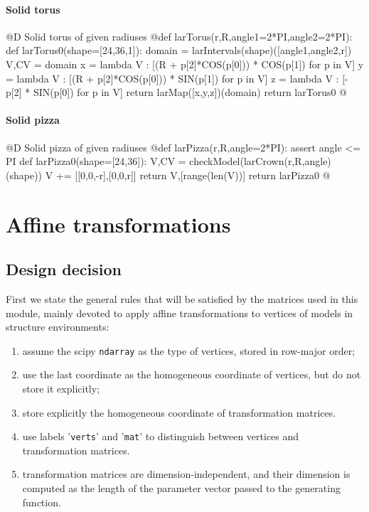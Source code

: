 \documentclass[11pt,oneside]{article}	%
\begin{document}
\paragraph{Solid torus}
@D Solid torus of given radiuses
@{def larTorus(r,R,angle1=2*PI,angle2=2*PI):
	def larTorus0(shape=[24,36,1]):
		domain = larIntervals(shape)([angle1,angle2,r])
		V,CV = domain
		x = lambda V : [(R + p[2]*COS(p[0])) * COS(p[1]) for p in V]
		y = lambda V : [(R + p[2]*COS(p[0])) * SIN(p[1]) for p in V]
		z = lambda V : [-p[2] * SIN(p[0]) for p in V]
		return larMap([x,y,z])(domain)
	return larTorus0
@}

\paragraph{Solid pizza}
@D Solid pizza of given radiuses
@{def larPizza(r,R,angle=2*PI):
	assert angle <= PI
	def larPizza0(shape=[24,36]):
		V,CV = checkModel(larCrown(r,R,angle)(shape))
		V += [[0,0,-r],[0,0,r]]
		return V,[range(len(V))]
	return larPizza0
@}
\section{Affine transformations}
\subsection{Design decision}
First we state the general rules that will be satisfied by the matrices used in this module, mainly devoted to apply affine transformations to vertices of models in structure environments:
\begin{enumerate}
\item assume the scipy \texttt{ndarray} as the type of vertices, stored in row-major order;
\item use the last coordinate as the homogeneous coordinate of vertices, but do not store it explicitly;
\item store explicitly the homogeneous coordinate of transformation matrices.
\item use labels '\texttt{verts}' and '\texttt{mat}' to distinguish between vertices and transformation matrices.
\item transformation matrices are dimension-independent, and their dimension is computed as the length of the parameter vector passed to the generating function.
\end{enumerate}
\end{document}
